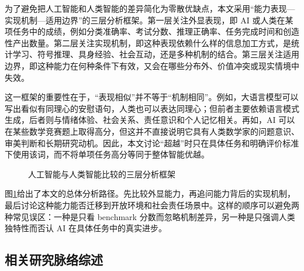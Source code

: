 \documentclass[UTF8,zihao=-4,a4paper]{ctexart}
\begin{document}
为了避免把人工智能和人类智能的差异简化为零散优缺点，本文采用“能力表现—实现机制—适用边界”的三层分析框架。第一层关注外显表现，即 AI 或人类在某项任务中的成绩，例如分类准确率、考试分数、推理正确率、任务完成时间和创造性产出数量。第二层关注实现机制，即这种表现依赖什么样的信息加工方式，是统计学习、符号推理、具身经验、社会互动，还是多种机制的结合。第三层关注适用边界，即这种能力在何种条件下有效，又会在哪些分布外、价值冲突或现实情境中失效。

这一框架的重要性在于，“表现相似”并不等于“机制相同”。例如，大语言模型可以写出看似有同理心的安慰语句，人类也可以表达同理心；但前者主要依赖语言模式生成，后者则与情绪体验、社会关系、责任意识和个人记忆相关。再如，AI 可以在某些数学竞赛题上取得高分，但这并不直接说明它具有人类数学家的问题意识、审美判断和长期研究动机。因此，本文讨论“超越”时只在具体任务和明确评价标准下使用该词，而不将单项任务高分等同于整体智能优越。

\begin{figure}[htbp]
\centering
{}
\caption{人工智能与人类智能比较的三层分析框架}
\label{fig:ai_human_framework}
\end{figure}

图\ref{fig:ai_human_framework}给出了本文的总体分析路径。先比较外显能力，再追问能力背后的实现机制，最后讨论这种能力能否迁移到开放环境和社会责任场景中。这样的顺序可以避免两种常见误区：一种是只看 benchmark 分数而忽略机制差异，另一种是只强调人类独特性而否认 AI 在具体任务中的真实进步。

\subsection{相关研究脉络综述}
\end{document}
